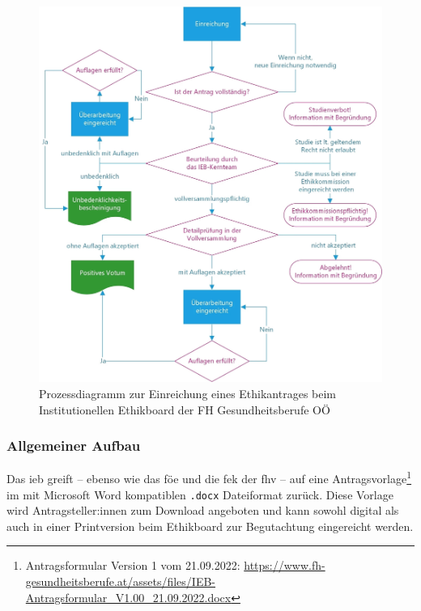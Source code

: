 \documentclass[a4paper,12pt,twoside]{scrreprt}
\begin{document}
\begin{figure}[ht]
    \centering
    \includegraphics[scale=0.15]{thesis/images/FHGOOE_Prozess-Ethikantrag.jpg}
    \caption[Prozessdiagramm zur Einreichung eines Ethikantrages beim Institutionellen Ethikboard der FH Gesundheitsberufe OÖ]{Prozessdiagramm zur Einreichung eines Ethikantrages beim Institutionellen Ethikboard der FH Gesundheitsberufe OÖ \cite{fh_gesundheitsberufe_oo_gmbh_einreichung_2023}}
    \label{fig:prozess-ethikantrag-ieb}
\end{figure}

\subsubsection*{Allgemeiner Aufbau}
\label{sub-sub-sec:fh-oö-allgemeiner-aufbau}

Das \ac{ieb} greift -- ebenso wie das \ac{föe} und die \ac{fek} der \ac{fhv} -- auf eine Antragsvorlage\footnote{Antragsformular Version 1 vom 21.09.2022: \url{https://www.fh-gesundheitsberufe.at/assets/files/IEB-Antragsformular_V1.00_21.09.2022.docx}} im mit Microsoft Word kompatiblen \texttt{.docx} Dateiformat zurück. Diese Vorlage wird Antragsteller:innen zum Download angeboten und kann sowohl digital als auch in einer Printversion beim Ethikboard zur Begutachtung eingereicht werden. \cite{fh_gesundheitsberufe_oo_gmbh_einreichung_2023}
\end{document}
